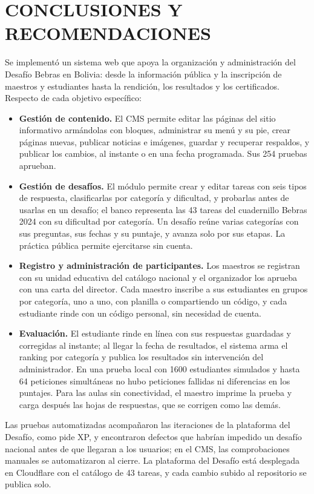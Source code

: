 \chapter{CONCLUSIONES Y RECOMENDACIONES}

Se implementó un sistema web que apoya la organización y administración del Desafío Bebras en Bolivia: desde la información pública y la inscripción de maestros y estudiantes hasta la rendición, los resultados y los certificados. Respecto de cada objetivo específico:

\begin{itemize}
    \item \textbf{Gestión de contenido.} El CMS permite editar las páginas del sitio informativo armándolas con bloques, administrar su menú y su pie, crear páginas nuevas, publicar noticias e imágenes, guardar y recuperar respaldos, y publicar los cambios, al instante o en una fecha programada. Sus 254 pruebas aprueban.
    \item \textbf{Gestión de desafíos.} El módulo permite crear y editar tareas con seis tipos de respuesta, clasificarlas por categoría y dificultad, y probarlas antes de usarlas en un desafío; el banco representa las 43 tareas del cuadernillo Bebras 2024 con su dificultad por categoría. Un desafío reúne varias categorías con sus preguntas, sus fechas y su puntaje, y avanza solo por sus etapas. La práctica pública permite ejercitarse sin cuenta.
    \item \textbf{Registro y administración de participantes.} Los maestros se registran con su unidad educativa del catálogo nacional y el organizador los aprueba con una carta del director. Cada maestro inscribe a sus estudiantes en grupos por categoría, uno a uno, con planilla o compartiendo un código, y cada estudiante rinde con un código personal, sin necesidad de cuenta.
    \item \textbf{Evaluación.} El estudiante rinde en línea con sus respuestas guardadas y corregidas al instante; al llegar la fecha de resultados, el sistema arma el ranking por categoría y publica los resultados sin intervención del administrador. En una prueba local con 1600 estudiantes simulados y hasta 64 peticiones simultáneas no hubo peticiones fallidas ni diferencias en los puntajes. Para las aulas sin conectividad, el maestro imprime la prueba y carga después las hojas de respuestas, que se corrigen como las demás.
\end{itemize}

Las pruebas automatizadas acompañaron las iteraciones de la plataforma del Desafío, como pide XP, y encontraron defectos que habrían impedido un desafío nacional antes de que llegaran a los usuarios; en el CMS, las comprobaciones manuales se automatizaron al cierre. La plataforma del Desafío está desplegada en Cloudflare con el catálogo de 43 tareas, y cada cambio subido al repositorio se publica solo.

